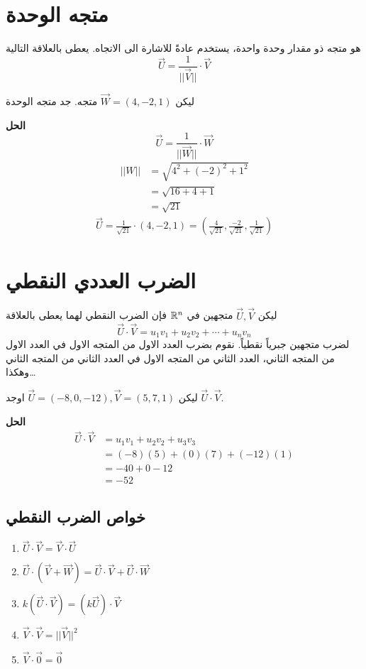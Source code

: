\section{متجه الوحدة}
هو متجه ذو مقدار وحدة واحدة، يستخدم عادةً للاشارة الى الاتجاه. يعطى بالعلاقة التالية
\[
\vec{U} = \frac{1}{|| \vec{V}||}\cdot \vec{V}
\]

\begin{example}
	ليكن $\vec{W}=(4,-2,1)$ متجه. جد متجه الوحدة
\end{example}
\noindent
\textbf{الحل}
\[
\vec{U} = \frac{1}{|| \vec{W}||}\cdot \vec{W}
\]
\begin{align*}
	||W|| &= \sqrt{4^2 + (-2)^2 + 1^2}\\
	& = \sqrt{16 + 4 +1}\\
	&= \sqrt{21}
\end{align*}
\begin{align*}
	\vec{U} = \frac{1}{\sqrt{21}}\cdot(4,-2,1) = \left(\frac{4}{\sqrt{21}}, \frac{-2}{\sqrt{21}}, \frac{1}{\sqrt{21}}\right)
\end{align*}

\section{الضرب العددي النقطي}
ليكن $\vec{U}, \vec{V}$ متجهين في $\mathbb{R}^n$ فإن الضرب النقطي لهما يعطى بالعلاقة 
\[
\vec{U} \cdot \vec{V} = u_1v_1 + u_2v_2 + \cdots + u_nv_n
\]
\noindent
لضرب متجهين جبرياً نقطياً. نقوم بضرب العدد الاول من المتجه الاول في العدد الاول من المتجه الثاني، العدد الثاني من المتجه الاول في العدد الثاني من المتجه الثاني وهكذا\dots
\begin{example}
	ليكن 
	$\vec{U} = (-8, 0, -12), \vec{V}=(5,7,1)$
	اوجد $\vec{U}\cdot\vec{V}$.
\end{example}
\noindent
\textbf{الحل}
\begin{align*}
	\vec{U}\cdot\vec{V} &= u_1v_1 + u_2v_2 + u_3v_3\\
	&= (-8)(5) + (0)(7) + (-12)(1)\\
	&= -40 + 0 -12\\
	&= -52
\end{align*}

\subsection*{خواص الضرب النقطي}

\begin{english}
	\begin{enumerate}
		\item $\vec{U}\cdot\vec{V}=\vec{V}\cdot\vec{U}$
		\item $\vec{U}\cdot(\vec{V}+\vec{W}) = \vec{U}\cdot\vec{V} + \vec{U}\cdot\vec{W}$
		\item $k(\vec{U}\cdot\vec{V}) = (k\vec{U})\cdot\vec{V}$
		\item $\vec{V}\cdot\vec{V} = ||\vec{V}||^2$
		\item $\vec{V}\cdot \vec{0} = \vec{0}$
	\end{enumerate}
\end{english}

